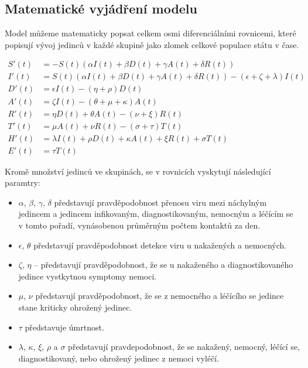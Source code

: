 \documentclass[a4paper,11pt]{article}
\begin{document}
		\subsection{Matematické vyjádření modelu}
		\label{mathmodel}
		Model můžeme matematicky popsat celkem osmi diferenciálními rovnicemi, které popisují vývoj jedinců v každé skupině jako zlomek celkové populace státu v čase.
		
		\begin{align}
			S'(t) &= - S(t) (\alpha I(t) + \beta D(t) + \gamma A(t) + \delta R(t))\\
			I'(t) &= S(t) (\alpha I(t) + \beta D(t) + \gamma A(t) + \delta R(t)) - (\epsilon + \zeta + \lambda)I(t)\\
			D'(t) &= \epsilon I(t) - (\eta + \rho) D(t)\\
			A'(t) &= \zeta I(t) - (\theta + \mu + \kappa) A(t)\\
			R'(t) &= \eta D(t) + \theta A(t) - (\nu + \xi) R(t)\\
			T'(t) &= \mu A(t) + \nu R(t) - (\sigma + \tau) T(t)\\
			H'(t) &= \lambda I(t) + \rho D(t) + \kappa A(t) + \xi R(t) + \sigma T(t)\\
			E'(t) &= \tau T(t)
		\end{align}
	
	Kromě množství jedinců ve skupinách, se v rovnicích vyskytují následující paramtry:
	\begin{itemize}
		\item $\alpha$, $\beta$, $\gamma$, $\delta$ představují pravděpodobnost přenosu viru mezi náchylným jedincem a jedincem infikovaným, diagnostikovaným, nemocným a léčícím se v tomto pořadí, vynásobenou průměrným počtem kontaktů za den.
		\item $\epsilon$, $\theta$ představují pravděpodobnost detekce viru u nakažených a nemocných.
		\item $\zeta$, $\eta$ -- představují pravděpodobnost, že se u nakaženého a diagnostikovaného jedince vystkytnou symptomy nemoci.
		\item $\mu$, $\nu$ představují pravděpodobnost, že se z nemocného a léčícího se jedince stane kriticky ohrožený jedinec.
		\item $\tau$ představuje úmrtnost.
		\item $\lambda$, $\kappa$, $\xi$, $\rho$ a $\sigma$ představují pravdepodobnost, že se nakažený, nemocný, léčící se, diagnostikovaný, nebo ohrožený jedinec z nemoci vyléčí.
	\end{itemize}
		
\end{document}
